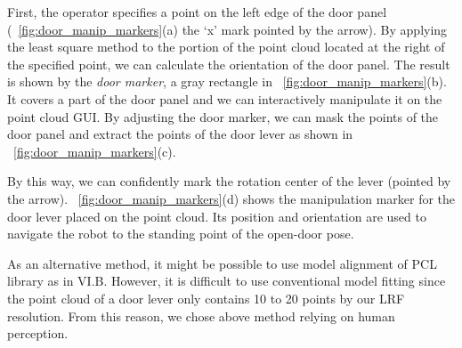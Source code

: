 First, the operator specifies a point on the left edge of the door panel
(\figurename~\ref{fig:door_manip_markers}(a) the `x' mark pointed by the arrow).
By applying the least square method to the portion of the point cloud located at the right of
the specified point, we can calculate the orientation of the door panel.
The result is shown by the {\it door marker}, a gray rectangle in
\figurename~\ref{fig:door_manip_markers}(b).
It covers a part of the door panel and we can interactively manipulate it on the point cloud GUI.
By adjusting the door marker, we can mask the points of the door panel and extract the points of
the door lever as shown in \figurename~\ref{fig:door_manip_markers}(c).

By this way, we can confidently mark the rotation center of the lever (pointed by the arrow).
\figurename~\ref{fig:door_manip_markers}(d) shows the manipulation marker for the door lever
placed on the point cloud.
Its position and orientation are used to navigate the robot to the standing point of the open-door pose.

As an alternative method, it might be possible to use model alignment of PCL library as in VI.B.
However, it is difficult to use conventional model fitting since the point cloud of 
a door lever only contains 10 to 20 points by our LRF resolution. 
From this reason, we chose above method relying on human perception.


